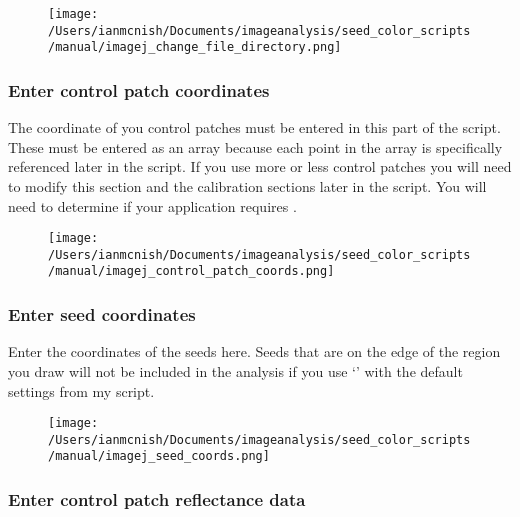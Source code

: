 \documentclass[12pt]{article}
\begin{document}
\begin{figure}[H]
	\centering
	\texttt{[image: /Users/ianmcnish/Documents/imageanalysis/seed\_color\_scripts/manual/imagej\_change\_file\_directory.png]}
	\label{fig:imagej_change_file_directory}
\end{figure}

\subsubsection{Enter control patch coordinates}\label{sec:control_patch_coords}

\noindent The coordinate of you control patches must be entered in this part of the script. These must be entered as an array because each point in the array is specifically referenced later in the script. If you use more or less control patches you will need to modify this section and the calibration sections later in the script. You will need to determine if your application requires .\\

\begin{figure}[H]
	\centering
	\texttt{[image: /Users/ianmcnish/Documents/imageanalysis/seed\_color\_scripts/manual/imagej\_control\_patch\_coords.png]}
	\label{fig:imagej_control_patch_coords}
\end{figure}

\subsubsection{Enter seed coordinates}\label{sec:seed_coords}

\noindent Enter the coordinates of the seeds here. Seeds that are on the edge of the region you draw will not be included in the analysis if you use `' with the default settings from my script.\\

\begin{figure}[H]
	\centering
	\texttt{[image: /Users/ianmcnish/Documents/imageanalysis/seed\_color\_scripts/manual/imagej\_seed\_coords.png]}
	\label{fig:imagej_change_file_directory}
\end{figure}

\subsubsection{Enter control patch reflectance data}\label{sec:control_patch_reflectance}
\end{document}
